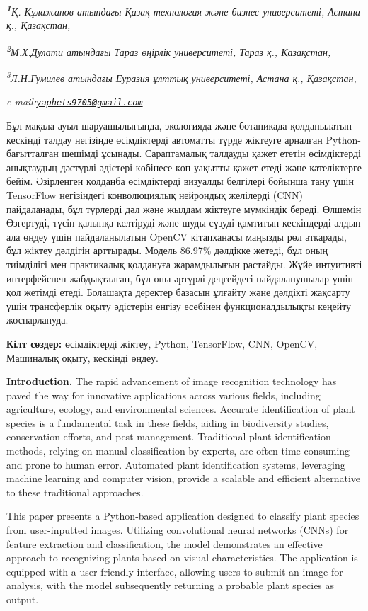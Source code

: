 {{\emph{{\bfseries \textsuperscript{1}}Қ. Құлажанов атындағы Қазақ технология
және бизнес университеті, Астана қ., Қазақстан,}

\emph{\textsuperscript{2}М.Х.Дулати атындағы Тараз өңірлік университеті,
Тараз қ., Қазақстан,}

\emph{\textsuperscript{3}Л.Н.Гумилев атындағы Еуразия ұлттық
университеті, Астана қ., Қазақстан,}

\emph{e-mail:\href{mailto:yaphets9705@gmail.com}{\nolinkurl{yaphets9705@gmail.com}}}

Бұл мақала ауыл шаруашылығында, экологияда және ботаникада қолданылатын
кескінді талдау негізінде өсімдіктерді автоматты түрде жіктеуге арналған
Python-бағытталған шешімді ұсынады. Сараптамалық талдауды қажет ететін
өсімдіктерді анықтаудың дәстүрлі әдістері көбінесе көп уақытты қажет
етеді және қателіктерге бейім. Әзірленген қолданба өсімдіктерді визуалды
белгілері бойынша тану үшін TensorFlow негізіндегі конволюциялық
нейрондық желілерді (CNN) пайдаланады, бұл түрлерді дәл және жылдам
жіктеуге мүмкіндік береді. Өлшемін Өзгертуді, түсін қалыпқа келтіруді
және шуды сүзуді қамтитын кескіндерді алдын ала өңдеу үшін
пайдаланылатын OpenCV кітапханасы маңызды рөл атқарады, бұл жіктеу
дәлдігін арттырады. Модель 86.97\% дәлдікке жетеді, бұл оның тиімділігі
мен практикалық қолдануға жарамдылығын растайды. Жүйе интуитивті
интерфейспен жабдықталған, бұл оны әртүрлі деңгейдегі пайдаланушылар
үшін қол жетімді етеді. Болашақта деректер базасын ұлғайту және дәлдікті
жақсарту үшін трансферлік оқыту әдістерін енгізу есебінен
функционалдылықты кеңейту жоспарлануда.

{\bfseries Кілт сөздер:} өсімдіктерді жіктеу, Python, TensorFlow, CNN,
OpenCV, Машиналық оқыту, кескінді өңдеу.

{\bfseries Introduction.} The rapid advancement of image recognition
technology has paved the way for innovative applications across various
fields, including agriculture, ecology, and environmental sciences.
Accurate identification of plant species is a fundamental task in these
fields, aiding in biodiversity studies, conservation efforts, and pest
management. Traditional plant identification methods, relying on manual
classification by experts, are often time-consuming and prone to human
error. Automated plant identification systems, leveraging machine
learning and computer vision, provide a scalable and efficient
alternative to these traditional approaches.

This paper presents a Python-based application designed to classify
plant species from user-inputted images. Utilizing convolutional neural
networks (CNNs) for feature extraction and classification, the model
demonstrates an effective approach to recognizing plants based on visual
characteristics. The application is equipped with a user-friendly
interface, allowing users to submit an image for analysis, with the
model subsequently returning a probable plant species as output.

}}
